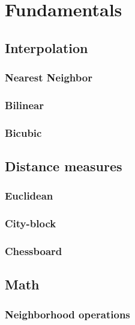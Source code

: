 \section{Fundamentals}

\subsection{Interpolation}
\subsubsection{Nearest Neighbor}
\subsubsection{Bilinear}
\subsubsection{Bicubic}

\subsection{Distance measures}

\subsubsection{Euclidean}
\subsubsection{City-block}
\subsubsection{Chessboard}

\subsection{Math}

\subsubsection{Neighborhood operations}

